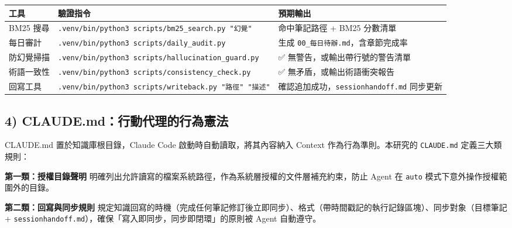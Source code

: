 {\def\LTcaptype{none} %
\begin{longtable}[]{@{}
  >{\raggedright\arraybackslash}p{}
  >{\raggedright\arraybackslash}p{}
  >{\raggedright\arraybackslash}p{}@{}}
\toprule\noalign{}
\begin{minipage}[b]{\linewidth}\raggedright
工具
\end{minipage} & \begin{minipage}[b]{\linewidth}\raggedright
驗證指令
\end{minipage} & \begin{minipage}[b]{\linewidth}\raggedright
預期輸出
\end{minipage} \\
\midrule\noalign{}
\endhead
\bottomrule\noalign{}
\endlastfoot
BM25 搜尋 & \texttt{.venv/bin/python3\ scripts/bm25\_search.py\ "幻覺"}
& 命中筆記路徑 + BM25 分數清單 \\
每日審計 & \texttt{.venv/bin/python3\ scripts/daily\_audit.py} & 生成
\texttt{00\_每日待辦.md}，含章節完成率 \\
防幻覺掃描 & \texttt{.venv/bin/python3\ scripts/hallucination\_guard.py}
& ✅ 無警告，或輸出帶行號的警告清單 \\
術語一致性 & \texttt{.venv/bin/python3\ scripts/consistency\_check.py} &
✅ 無矛盾，或輸出術語衝突報告 \\
回寫工具 &
\texttt{.venv/bin/python3\ scripts/writeback.py\ "路徑"\ "描述"} &
確認追加成功，\texttt{sessionhandoff.md} 同步更新 \\
\end{longtable}
}

\subsection{4)
CLAUDE.md：行動代理的行為憲法}\label{claude.mdux884cux52d5ux4ee3ux7406ux7684ux884cux70baux61b2ux6cd5}

CLAUDE.md 置於知識庫根目錄，Claude Code 啟動時自動讀取，將其內容納入
Context 作為行為準則。本研究的 \texttt{CLAUDE.md} 定義三大類規則：

\textbf{第一類：授權目錄聲明}
明確列出允許讀寫的檔案系統路徑，作為系統層授權的文件層補充約束，防止
Agent 在 \texttt{auto} 模式下意外操作授權範圍外的目錄。

\textbf{第二類：回寫與同步規則}
規定知識回寫的時機（完成任何筆記修訂後立即同步）、格式（帶時間戳記的執行記錄區塊）、同步對象（目標筆記
+ \texttt{sessionhandoff.md}），確保「寫入即同步，同步即閉環」的原則被
Agent 自動遵守。

